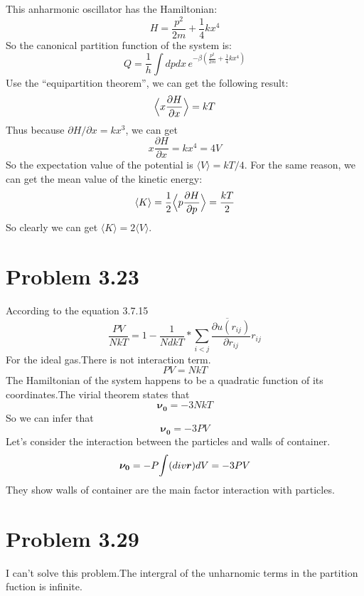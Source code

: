 \documentclass{article}
\begin{document}
	This anharmonic oscillator has the Hamiltonian:
	$$
	H = \frac{p^2}{2m} + \frac{1}{4}kx^4
	$$
	So the canonical partition function of the system is:
	\begin{equation}
	Q = \frac{1}{h}\int dpdx\,e^{-\beta\left(\frac{p^2}{2m} + \frac{1}{4}kx^4\right) }
	\end{equation}
	Use the ``equipartition theorem'', we can get the following result:
	\begin{equation}
	\Big{\langle} x \frac{\partial H}{\partial x}\Big{\rangle} =kT
	\end{equation}
	Thus because $\partial H/\partial x = kx^3$, we can get
	$$
	x\frac{\partial H}{\partial x} = kx^4 = 4V
	$$
	So the expectation value of the potential is $\langle V\rangle = kT/4$. For the same reason, we can get the mean value of the kinetic energy:
	\begin{equation}
	\langle K\rangle = \frac{1}{2}\Big{\langle} p\frac{\partial H}{\partial p}\Big{\rangle} = \frac{kT}{2}
	\end{equation}
	So clearly we can get $\langle K\rangle = 2\langle V\rangle$.
	

\section*{Problem 3.23} %
\label{sec:problem_3_23}
	According to the equation 3.7.15
	$$
	\frac{PV}{NkT}=1-\frac{1}{NdkT}*\overline{\sum_{i<j}\frac{\partial{u(r_{ij})}}{\partial{r_{ij}}}r_{ij}}
	$$
	For the ideal gas.There is not interaction term.
	$$
	PV=NkT
	$$
	The Hamiltonian of the system happens to be a quadratic function of its coordinates.The virial theorem states that
	$$
	\boldsymbol{\nu_0}=-3NkT
	$$
	So we can infer that
	$$
	\boldsymbol{\nu_0}=-3PV
	$$
	Let's consider the interaction between the particles and walls of container. 
	$$
	\boldsymbol{\nu_0}=-P\mathlarger{\int}(div\boldsymbol{ r})dV=-3PV
	$$
	They show walls of container are the main factor interaction with particles.


\section*{Problem 3.29}
	I can't solve this problem.The intergral of the unharnomic terms in the partition fuction is infinite.
	
\end{document}
